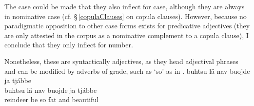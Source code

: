 The case could be made that they also inflect for case, although they are always in nominative case (cf. §\,\ref{copulaClauses} on copula clauses). %
However, because no paradigmatic opposition to other case forms exists for predicative adjectives (they are only attested in the corpus as a nominative complement to a copula clause), I conclude that they only inflect for number. 

Nonetheless, these are syntactically adjectives, as they head adjectival phrases and can be modified by adverbs of grade, such as  ‘so’ as in .
\ea\label{adjPredEx3}
\glll	buhtsu lä nav buojde ja tjábbe\\
	buhtsu lä nav buojde ja tjábbe\\
	reindeer\BS{} be\BS{} so fat\BS{} and beautiful\BS{}\\\nopagebreak
{}	
\z

